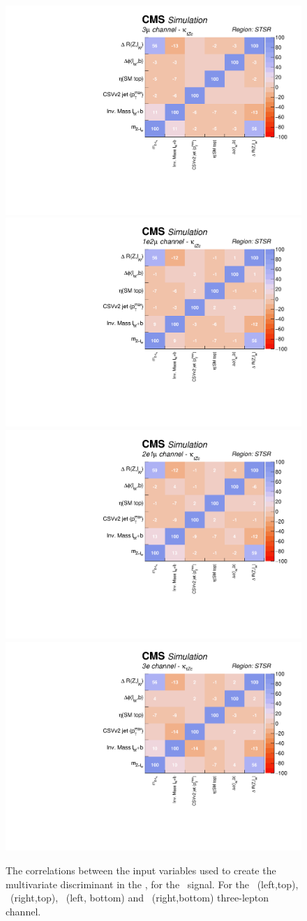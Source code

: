 \begin{figure}[htbp]
	\centering
	\includegraphics[width=0.49\linewidth]{6_Search/Figures/PlotsTechnics/correlationsigZctsingletopuuu}
	\includegraphics[width=0.49\linewidth]{6_Search/Figures/PlotsTechnics/correlationsigZctsingletopuue}
	\includegraphics[width=0.49\linewidth]{6_Search/Figures/PlotsTechnics/correlationsigZctsingletopeeu}
	\includegraphics[width=0.49\linewidth]{6_Search/Figures/PlotsTechnics/correlationsigZctsingletopeee}
	\caption{The correlations between the input variables used to create the multivariate discriminant in the \STSR, for the \Zct\ signal. For the \mumumu\ (left,top), \emumu\ (right,top), \eemu\ (left, bottom) and \eee\ (right,bottom) three-lepton channel.}
	\label{fig:correlationsigzctsingletop}
\end{figure}

